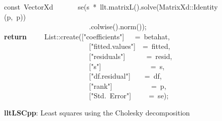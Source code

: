\documentclass[shortnames,article]{jss}
\newcommand{\hlstd}[1]{\textcolor[rgb]{0,0,0}{#1}}
\newcommand{\hlopt}[1]{\textcolor[rgb]{0,0,0}{#1}}
\newcommand{\hlstr}[1]{\textcolor[rgb]{0.90,0.15,0.15}{#1}}
\newcommand{\hlkwa}[1]{\textcolor[rgb]{0.61,0.13,0.93}{\bf{#1}}}
\newcommand{\hlkwb}[1]{\textcolor[rgb]{0.13,0.54,0.13}{#1}}
\newcommand{\hlkwd}[1]{\textcolor[rgb]{0,0,0}{#1}}
\begin{document}
\begin{figure}[tbh]
  \hlstd{}\hlkwb{const\ }\hlstd{VectorXd}\hlstd{\ \ \ \ \ \ \ }\hlstd{}\hlkwd{se}\hlstd{}\hlopt{(}\hlstd{s\ }\hlopt{{*}\ }\hlstd{llt}\hlopt{.}\hlstd{}\hlkwd{matrixL}\hlstd{}\hlopt{().}\hlstd{}\hlkwd{solve}\hlstd{}\hlopt{(}\hlstd{MatrixXd}\hlopt{::}\hlstd{}\hlkwd{Identity}\hlstd{}\hlopt{(}\hlstd{p}\hlopt{,\ }\hlstd{p}\hlopt{))}\hspace*{\fill}\\
  \hlstd{}\hlstd{\ \ \ \ \ \ \ \ \ \ \ \ \ \ \ \ \ \ \ \ \ \ \ \ }\hlstd{}\hlopt{.}\hlstd{}\hlkwd{colwise}\hlstd{}\hlopt{().}\hlstd{}\hlkwd{norm}\hlstd{}\hlopt{());}\hspace*{\fill}\\
  \hlstd{}\hlkwa{return}\hlstd{\ \ \ \ \ }\hlkwa{}\hlstd{List}\hlopt{::}\hlstd{}\hlkwd{create}\hlstd{}\hlopt{(}\hlstd{\textunderscore }\hlopt{{[}}\hlstd{}\hlstr{"coefficients"}\hlstd{}\hlopt{{]}}\hlstd{\ \ \ }\hlopt{=\ }\hlstd{betahat}\hlopt{,}\hspace*{\fill}\\
  \hlstd{}\hlstd{\ \ \ \ \ \ \ \ \ \ \ \ \ \ \ \ \ \ \ \ \ \ \ \ }\hlstd{\textunderscore }\hlopt{{[}}\hlstd{}\hlstr{"fitted.values"}\hlstd{}\hlopt{{]}}\hlstd{\ \ }\hlopt{=\ }\hlstd{fitted}\hlopt{,}\hspace*{\fill}\\
  \hlstd{}\hlstd{\ \ \ \ \ \ \ \ \ \ \ \ \ \ \ \ \ \ \ \ \ \ \ \ }\hlstd{\textunderscore }\hlopt{{[}}\hlstd{}\hlstr{"residuals"}\hlstd{}\hlopt{{]}}\hlstd{\ \ \ \ \ \ }\hlopt{=\ }\hlstd{resid}\hlopt{,}\hspace*{\fill}\\
  \hlstd{}\hlstd{\ \ \ \ \ \ \ \ \ \ \ \ \ \ \ \ \ \ \ \ \ \ \ \ }\hlstd{\textunderscore }\hlopt{{[}}\hlstd{}\hlstr{"s"}\hlstd{}\hlopt{{]}}\hlstd{\ \ \ \ \ \ \ \ \ \ \ \ \ \ }\hlopt{=\ }\hlstd{s}\hlopt{,}\hspace*{\fill}\\
  \hlstd{}\hlstd{\ \ \ \ \ \ \ \ \ \ \ \ \ \ \ \ \ \ \ \ \ \ \ \ }\hlstd{\textunderscore }\hlopt{{[}}\hlstd{}\hlstr{"df.residual"}\hlstd{}\hlopt{{]}}\hlstd{\ \ \ \ }\hlopt{=\ }\hlstd{df}\hlopt{,}\hspace*{\fill}\\
  \hlstd{}\hlstd{\ \ \ \ \ \ \ \ \ \ \ \ \ \ \ \ \ \ \ \ \ \ \ \ }\hlstd{\textunderscore }\hlopt{{[}}\hlstd{}\hlstr{"rank"}\hlstd{}\hlopt{{]}}\hlstd{\ \ \ \ \ \ \ \ \ \ \ }\hlopt{=\ }\hlstd{p}\hlopt{,}\hspace*{\fill}\\
  \hlstd{}\hlstd{\ \ \ \ \ \ \ \ \ \ \ \ \ \ \ \ \ \ \ \ \ \ \ \ }\hlstd{\textunderscore }\hlopt{{[}}\hlstd{}\hlstr{"Std.\ Error"}\hlstd{}\hlopt{{]}}\hlstd{\ \ \ \ \ }\hlopt{=\ }\hlstd{se}\hlopt{);}\hlstd{}\hspace*{\fill}\\
  \mbox{}
  \normalfont
  \normalsize
  \caption{\textbf{lltLSCpp}: Least squares using the Cholesky decomposition}
  \label{lltLS}
\end{figure}
\end{document}

